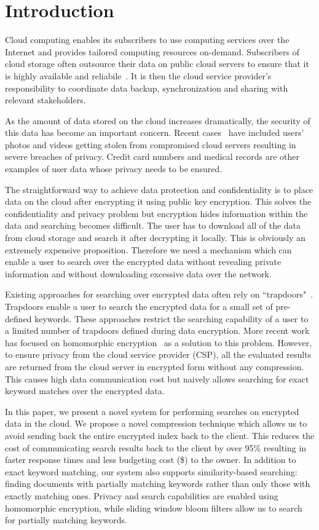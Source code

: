 \section{Introduction}

Cloud computing enables its subscribers to use computing services over the 
Internet and provides tailored computing resources on-demand. 
Subscribers of cloud storage often outsource their data on public cloud servers
to ensure that it is highly available and reliabile~\cite{wang2012toward}. 
It is then the cloud service provider's
responsibility to coordinate data backup, synchronization and sharing
with relevant stakeholders. 

As the amount of data stored on the cloud increases dramatically, the security 
of this data has become an important concern. Recent cases~\cite{top_threats}
have included users' photos and videos getting stolen from compromised cloud servers resulting in
severe breaches of privacy. Credit card numbers and medical
records are other examples of user data whose privacy needs to be ensured.

The straightforward way to achieve data protection and confidentiality is to
place data on the cloud after encrypting it using public key encryption.
This solves the confidentiality and privacy problem
but encryption hides information within the data and searching becomes difficult. The user
has to download all of the data from cloud storage and search it after decrypting it locally. This is
obviously an extremely expensive proposition. Therefore we need a mechanism 
which can enable a user to search over the encrypted data without revealing 
private information and without downloading excessive data over the network.

Existing approaches for searching over encrypted data often rely on
``trapdoors"~\cite{song,goh2003secure,boneh}. 
Trapdoors enable a user to search the encrypted data for a small 
set of pre-defined keywords. These approaches restrict the searching
capability of a user to a limited number of trapdoors defined during data 
encryption. More recent work has focused on homomorphic encryption~\cite{craig,zeehan} as a solution
to this problem. However, to ensure privacy from the cloud service provider (CSP), 
all the evaluated results
are returned from the cloud server in encrypted form without any compression. This causes high data
communication cost but naively allows searching for exact keyword matches over the encrypted data.

In this paper, we present a novel system for performing searches on encrypted 
data in the cloud. We propose a novel compression technique which allows us to
avoid sending back the entire encrypted index back to the client. This reduces the cost of
communicating search results back to the client by over 95\% resulting in 
faster response times and less budgeting cost (\$) to the owner. 
In addition to exact keyword matching, our system also
supports similarity-based searching: finding documents with partially matching 
keywords rather than only those with exactly matching ones. Privacy and search 
capabilities are enabled using homomorphic encryption, while sliding window 
bloom filters allow us to search for partially matching keywords. 

